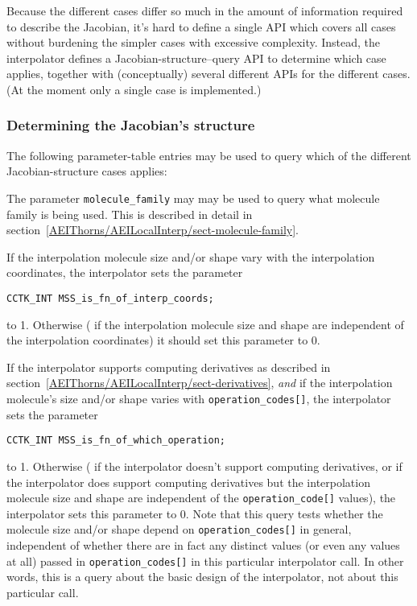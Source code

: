 Because the different cases differ so much in the amount of information
required to describe the Jacobian, it's hard to define a single API
which covers all cases without burdening the simpler cases with
excessive complexity.  Instead, the interpolator defines a
Jacobian-structure--query API to determine which case applies,
together with (conceptually) several different APIs for the
different cases.  (At the moment only a single case is implemented.)


\subsubsection{Determining the Jacobian's structure}
\label{AEIThorns/AEILocalInterp/sect-Jacobian/structure}

The following parameter-table entries may be used to query which
of the different Jacobian-structure cases applies:

The parameter \verb|molecule_family| may may be used to query what
molecule family is being used.  This is described in detail in
section~\ref{AEIThorns/AEILocalInterp/sect-molecule-family}.

If the interpolation molecule size and/or shape vary with the
interpolation coordinates, the interpolator sets the parameter
\begin{verbatim}
CCTK_INT MSS_is_fn_of_interp_coords;
\end{verbatim}
to 1.  Otherwise (\ie{} if the interpolation molecule size and shape
are independent of the interpolation coordinates) it should set this
parameter to 0.

If the interpolator supports computing derivatives as described in
section~\ref{AEIThorns/AEILocalInterp/sect-derivatives}, {\em and\/}
if the interpolation molecule's size and/or shape varies with
\verb|operation_codes[]|, the interpolator sets the parameter
\begin{verbatim}
CCTK_INT MSS_is_fn_of_which_operation;
\end{verbatim}
to 1.  Otherwise (\ie{} if the interpolator doesn't support computing
derivatives, or if the interpolator does support computing derivatives
but the interpolation molecule size and shape are independent of the
\verb|operation_code[]| values), the interpolator sets this parameter
to 0.  Note that this query tests whether the molecule size and/or shape
depend on \verb|operation_codes[]| in general, independent of whether
there are in fact any distinct values (or even any values at all) passed
in \verb|operation_codes[]| in this particular interpolator call.  In
other words, this is a query about the basic design of the interpolator,
not about this particular call.

